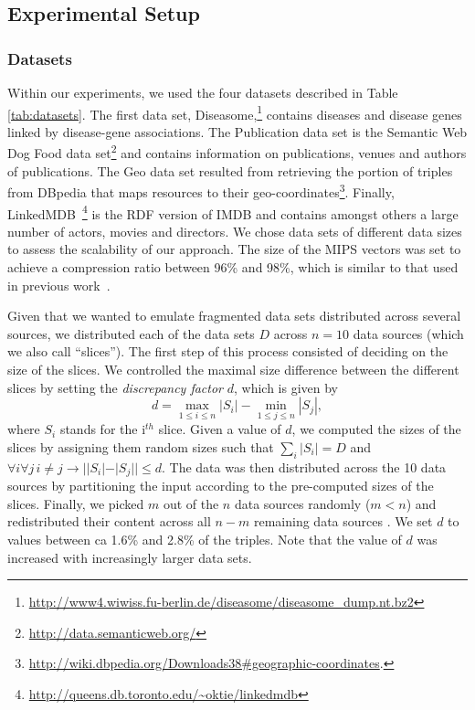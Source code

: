 \documentclass{sig-alternate}  %
\begin{document}
\subsection{Experimental Setup}

\subsubsection{Datasets}
Within our experiments, we used the four datasets described in Table \ref{tab:datasets}.
The first data set, Diseasome,\footnote{\url{http://www4.wiwiss.fu-berlin.de/diseasome/diseasome_dump.nt.bz2}} contains diseases and disease genes linked by disease-gene associations.
The Publication data set is the Semantic Web Dog Food data set\footnote{\url{http://data.semanticweb.org/}} and contains information on publications, venues and authors of publications.
The Geo data set resulted from retrieving the portion of triples from DBpedia that maps resources to their geo-coordinates\footnote{\url{http://wiki.dbpedia.org/Downloads38\#geographic-coordinates}.}.
Finally, LinkedMDB~\footnote{\url{http://queens.db.toronto.edu/~oktie/linkedmdb}} is the RDF version of IMDB and contains amongst others a large number of actors, movies and directors.
We chose data sets of different data sizes to assess the scalability of our approach.
The size of the MIPS vectors was set to achieve a compression ratio between 96\% and 98\%, which is similar to that used in previous work~\cite{key-5}.

Given that we wanted to emulate fragmented data sets distributed across several sources, we distributed each of the data sets $D$ across $n=10$ data sources (which we also call ``slices'').
The first step of this process consisted of deciding on the size of the slices.
We controlled the maximal size difference between the different slices by setting the \emph{discrepancy factor} $d$, which is given by
\begin{equation}
d = \max\limits_{1 \leq i \leq n} |S_i| - \min\limits_{1 \leq j \leq n} |S_j|,
\end{equation}
where $S_i$ stands for the i$^{th}$ slice. 
Given a value of $d$, we computed the sizes of the slices by assigning them random sizes such that $\sum\limits_{i} |S_i| = D$ and $\forall i \forall j\,i \neq j \rightarrow ||S_i| - |S_j|| \leq d$.
The data was then distributed across the 10 data sources by partitioning the input according to the pre-computed sizes of the slices.
Finally, we picked $m$ out of the $n$ data sources randomly ($m < n$) and redistributed their content across all $n-m$ remaining data sources .
We set $d$ to values between ca 1.6\% and 2.8\% of the triples.
Note that the value of $d$ was increased with increasingly larger data sets.
\end{document}
